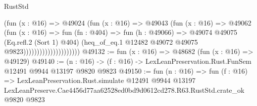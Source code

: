 \begin{lexlean}{RustStd}
\begin{coremodule}
                                    (fun (x : @16) =>
                                    @49024
                                      (fun (x : @16) =>
                                      @49043
                                        (fun (x : @16) =>
                                        @49062
                                          (fun (x : @16) =>
                                          fun (fn : @404) =>
                                          fun (h : @49066) =>
                                          @49074
                                            @49075
                                            (Eq.refl.{2} (Sort 1) @404)
                                            (heq_of_eq.{1}
                                              @12482
                                              @49072
                                              @49075
                                              @9823)))))))))))))))))))))
@49132 := fun (x : @16) => @48682 (fun (x : @16) => @49129)
@49140 := (n : @16) -> (f : @16) -> LexLeanPreservation.Rust.FunSem @12491 @9944 @13197 @9820 @9823
@49150 := fun (n : @16) =>
  fun (f : @16) =>
  LexLeanPreservation.Rust.simulate
    @12491
    @9944
    @13197
    LexLeanPreserve.Cae4456d77aa62528ed0bd9d0612cd278.R63.RustStd.crate_ok
    @9820
    @9823
\end{coremodule}
\end{lexlean}

